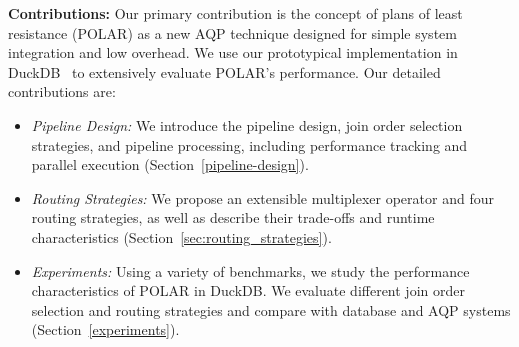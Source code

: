 \textbf{Contributions:} Our primary contribution is the concept of plans of least resistance (POLAR) as a new AQP technique designed for simple system integration and low overhead. We use our prototypical implementation in DuckDB~\cite{RaasveldtM19} to extensively evaluate POLAR’s performance. Our detailed contributions are:
\begin{itemize}
    \item \emph{Pipeline Design:} We introduce the pipeline design, join order selection strategies, and pipeline processing, including performance tracking and parallel execution (Section~\ref{pipeline-design}).
    \item \emph{Routing Strategies:} We propose an extensible multiplexer operator and four routing strategies, as well as describe their trade-offs and runtime characteristics (Section~\ref{sec:routing_strategies}).
    \item \emph{Experiments:} Using a variety of benchmarks, we study the performance characteristics of POLAR in DuckDB. We evaluate different join order selection and routing strategies and compare with database and AQP systems (Section~\ref{experiments}).
\end{itemize}
